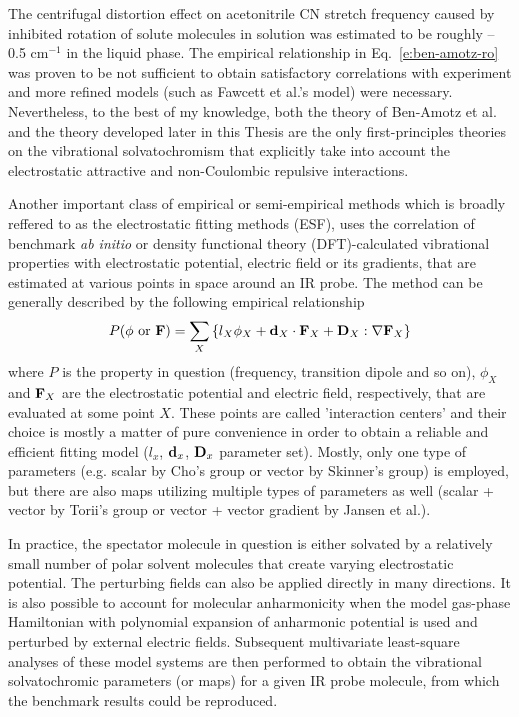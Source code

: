 \documentclass[a4paper,titlepage,twoside,fleqn,12pt]{book}
\begin{document}
\begin{refsection}
The centrifugal distortion effect on acetonitrile CN stretch frequency 
caused by inhibited rotation of solute molecules
in solution was estimated to be roughly --0.5 cm$^{-1}$ in the liquid phase.  
The empirical relationship in Eq.~\eqref{e:ben-amotz-ro} was proven to be not sufficient to obtain 
satisfactory correlations with experiment and more refined
models (such as Fawcett et al.'s model) were necessary.\citep{Reimers.Hall.JACS.1999} 
Nevertheless, 
to the best of my knowledge, both the theory of Ben-Amotz et al.\citep{Ben-Amotz.Lee.Cho.List.JCP.1992} 
and the theory
developed later in this Thesis are the only first-principles theories on the
vibrational solvatochromism that explicitly take into account the electrostatic 
attractive and non-Coulombic repulsive interactions.

Another important class of empirical or semi\hyp{}empirical methods which is broadly reffered 
to as the electrostatic fitting methods (ESF), uses the correlation of benchmark 
\emph{ab initio} or density functional theory (DFT)-calculated vibrational properties
with electrostatic potential, electric field or its gradients, that are estimated at various
points in space around an IR probe. 
The method can be generally described by the following empirical relationship
%
\begin{equation} \label{e:esf}
 P(\phi \text{ or } {\bf F}) = \sum_X \left\{ l_X \phi_X + {\bf d}_X \cdot {\bf F}_X + {\bf D}_X : \nabla{\bf F}_X \right\}
\end{equation}
%
where $P$ is the property in question (frequency, transition dipole and so on), 
$\phi_X$ and ${\bf F}_X$ are the electrostatic potential and electric field, respectively, that are
evaluated at some point $X$.
These points are called 'interaction centers' and their
choice is mostly a matter of pure convenience in order to obtain a reliable and efficient
fitting model ($l_x$, ${\bf d}_x$, ${\bf D}_x$ parameter set). Mostly, only one type of parameters
(e.g. scalar by Cho's group or vector by Skinner's group) is employed, but there are also maps utilizing multiple types of parameters
as well (scalar + vector by Torii's group or vector + vector gradient by Jansen et al.).
 
In practice, the spectator molecule in question is either solvated by a relatively small number of polar 
solvent molecules that create varying electrostatic potential. The perturbing fields can also be applied directly
in many directions. It is also possible to account for molecular anharmonicity
when the model gas\hyp{}phase Hamiltonian with polynomial expansion of anharmonic potential
is used and perturbed by external electric fields.
Subsequent multivariate
least-square analyses of these model systems are then performed to obtain the vibrational 
solvatochromic parameters (or maps) for a given IR probe molecule, from which the benchmark
results could be reproduced. 


\end{refsection}
\end{document}
